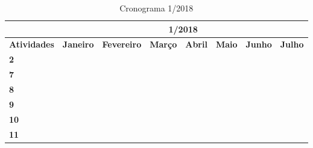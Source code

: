 \documentclass[a4paper,12pt]{article}
\begin{document}
\begin{table}[H]
\centering
\caption{Cronograma 1/2018}
\label{my-label}
\begin{tabular}{|l|l|l|l|l|l|l|l|}
\hline
                    & \multicolumn{7}{c|}{\textbf{1/2018}}                                                                                                                                                                                                                        \\ \hline
\textbf{Atividades} & \textbf{Janeiro}         & \textbf{Fevereiro}                              & \textbf{Março}           & \textbf{Abril}                                  & \textbf{Maio}                                   & \textbf{Junho} & \textbf{Julho}                                 \\ \hline
\textbf{2} & \cellcolor[HTML]{000000} & \cellcolor[HTML]{000000} & \cellcolor[HTML]{000000} & \cellcolor[HTML]{000000} & &  &\\
 \hline
\textbf{7}          & \cellcolor[HTML]{000000} & \cellcolor[HTML]{000000}{\color[HTML]{000000} } & \cellcolor[HTML]{000000} &                                 \cellcolor[HTML]{000000}                &                                                 &                              &                   \\ \hline
\textbf{8}         &                          &                                                 &  & \cellcolor[HTML]{000000}{\color[HTML]{000000} } &                                                \cellcolor[HTML]{000000} &   &                                              \\ \hline
\textbf{9}         &                          &                                                 &                          &                         &                      \cellcolor[HTML]{000000} &                          &                                                 \\ \hline
\textbf{10}         &                          &                                                 &                          &                                                 &                         &       \cellcolor[HTML]{000000} &                                          \\ \hline
\textbf{11}         &                          &                                                 &                          &                                &                 & \cellcolor[HTML]{000000}{\color[HTML]{000000} } & \cellcolor[HTML]{000000}{\color[HTML]{000000} } \\ \hline
\end{tabular}
\end{table}		
		
		
\newpage

\nocite{*}

\end{document}
